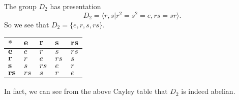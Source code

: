 \begin{example}
    The group $D_2$ has presentation
    \[
        D_2 = \langle r, s \vert r^2 = s^2 = e, rs = sr \rangle.
    \]
    So we see that $D_2 = \{e, r, s, rs\}$.

    \begin{table}[h]
        \centering
        \begin{tabular}{|l|l|l|l|l|}
            \hline
            $\boldsymbol{\ast}$ & $\boldsymbol{e}$ & $\boldsymbol{r}$ & $\boldsymbol{s}$ & $\boldsymbol{rs}$ \\ \hline
            $\boldsymbol{e}$    & $e$              & $r$              & $s$              & $rs$              \\ \hline
            $\boldsymbol{r}$    & $r$              & $e$              & $rs$             & $s$               \\ \hline
            $\boldsymbol{s}$    & $s$              & $rs$             & $e$              & $r$               \\ \hline
            $\boldsymbol{rs}$   & $rs$             & $s$              & $r$              & $e$               \\ \hline
        \end{tabular}
    \end{table}

    In fact, we can see from the above Cayley table that $D_2$ is indeed abelian.
\end{example}

